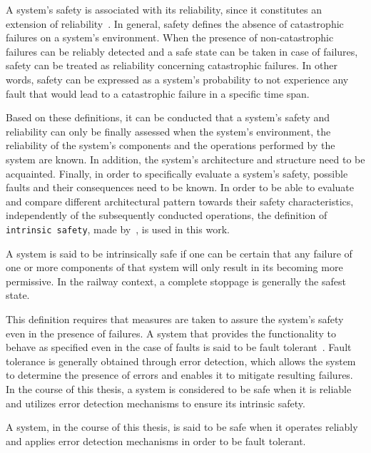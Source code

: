 A system's safety is associated with its reliability, since it constitutes an extension of reliability~\cite{AvizienisDependability2001}.
In general, safety defines the absence of catastrophic failures on a system's environment.
When the presence of non-catastrophic failures can be reliably detected and a safe state can be taken in case of failures, safety can be treated as reliability concerning catastrophic failures.
In other words, safety can be expressed as a system's probability to not experience any fault that would lead to a catastrophic failure in a specific time span.

Based on these definitions, it can be conducted that a system's safety and reliability can only be finally assessed when the system's environment, the reliability of the system's components and the operations performed by the system are known.
In addition, the system's architecture and structure need to be acquainted.
Finally, in order to specifically evaluate a system's safety, possible faults and their consequences need to be known.
In order to be able to evaluate and compare different architectural pattern towards their safety characteristics, independently of the subsequently conducted operations, the definition of \texttt{intrinsic safety}, made by~\cite{BoulangerStandards}, is used in this work.

\begin{definition}
A system is said to be intrinsically safe if one can be certain that any failure of one or more components of that system will only result in its becoming more permissive.
In the railway context, a complete stoppage is generally the safest state.
\label{def:intrinsic_safety}
\end{definition}

This definition requires that measures are taken to assure the system's safety even in the presence of failures.
A system that provides the functionality to behave as specified even in the case of faults is said to be fault tolerant~\cite{AvizienisDependability2001}.
Fault tolerance is generally obtained through error detection, which allows the system to determine the presence of errors and enables it to mitigate resulting failures.
In the course of this thesis, a system is considered to be safe when it is reliable and utilizes error detection mechanisms to ensure its intrinsic safety.
\begin{definition}
A system, in the course of this thesis, is said to be safe when it operates reliably and applies error detection mechanisms in order to be fault tolerant.
\label{def:safety}
\end{definition}

